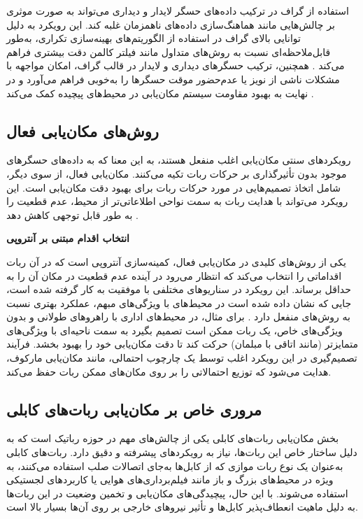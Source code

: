  استفاده از گراف در ترکیب داده‌های حسگر لایدار و دیداری می‌تواند به صورت موثری بر چالش‌هایی مانند هماهنگ‌سازی داده‌های ناهمزمان غلبه کند. این رویکرد به دلیل توانایی بالای گراف در استفاده از الگوریتم‌های بهینه‌سازی تکراری، به‌طور قابل‌ملاحظه‌ای نسبت به روش‌های متداول مانند فیلتر کالمن دقت بیشتری فراهم می‌کند \cite{song2021tightly}. همچنین، ترکیب حسگرهای دیداری و لایدار در قالب گراف، امکان مواجهه با مشکلات ناشی از نویز یا عدم‌حضور موقت حسگرها را به‌خوبی فراهم می‌آورد و در نهایت به بهبود مقاومت سیستم مکان‌یابی در محیط‌های پیچیده کمک می‌کند \cite{yang2022indoor}.
 


\subsection{روش‌های مکان‌یابی فعال}

رویکردهای سنتی مکان‌یابی اغلب منفعل هستند، به این معنا که به داده‌های حسگرهای موجود بدون تأثیرگذاری بر حرکات ربات تکیه می‌کنند. مکان‌یابی فعال، از سوی دیگر، شامل اتخاذ تصمیم‌هایی در مورد حرکات ربات برای بهبود دقت مکان‌یابی است. این رویکرد می‌تواند با هدایت ربات به سمت نواحی اطلاعاتی‌تر از محیط، عدم قطعیت را به طور قابل توجهی کاهش دهد
\cite{burgard1997active}.

\textbf{انتخاب اقدام مبتنی بر آنتروپی}

یکی از روش‌های کلیدی در مکان‌یابی فعال، کمینه‌سازی آنتروپی است که در آن ربات اقداماتی را انتخاب می‌کند که انتظار می‌رود در آینده عدم قطعیت در مکان آن را به حداقل برساند. این رویکرد در سناریوهای مختلفی با موفقیت به کار گرفته شده است، جایی که نشان داده شده است در محیط‌های با ویژگی‌های مبهم، عملکرد بهتری نسبت به روش‌های منفعل دارد
\cite{burgard1997active2}.
برای مثال، در محیط‌های اداری با راهروهای طولانی و بدون ویژگی‌های خاص، یک ربات ممکن است تصمیم بگیرد به سمت ناحیه‌ای با ویژگی‌های متمایزتر (مانند اتاقی با مبلمان) حرکت کند تا دقت مکان‌یابی خود را بهبود بخشد. فرآیند تصمیم‌گیری در این رویکرد اغلب توسط یک چارچوب احتمالی، مانند مکان‌یابی مارکوف، هدایت می‌شود که توزیع احتمالاتی را بر روی مکان‌های ممکن ربات حفظ می‌کند.

\subsection{مروری خاص بر مکان‌یابی ربات‌های کابلی}

بخش مکان‌یابی ربات‌های کابلی یکی از چالش‌های مهم در حوزه رباتیک است که به دلیل ساختار خاص این ربات‌ها، نیاز به رویکردهای پیشرفته و دقیق دارد. ربات‌های کابلی به‌عنوان یک نوع ربات موازی که از کابل‌ها به‌جای اتصالات صلب استفاده می‌کنند، به ویژه در محیط‌های بزرگ و باز مانند فیلم‌برداری‌های هوایی یا کاربردهای لجستیکی استفاده می‌شوند. با این حال، پیچیدگی‌های مکان‌یابی و تخمین وضعیت در این ربات‌ها به دلیل ماهیت انعطاف‌پذیر کابل‌ها و تأثیر نیروهای خارجی بر روی آن‌ها بسیار بالا است.

